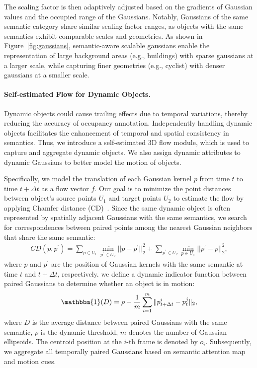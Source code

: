 The scaling factor is then adaptively adjusted based on the gradients of Gaussian values and the occupied range of the Gaussians. Notably, Gaussians of the same semantic category share similar scaling factor ranges, as objects with the same semantics exhibit comparable scales and geometries. As shown in Figure~\ref{fig:gaussians}, semantic-aware scalable gaussians enable the representation of large background areas (e.g., buildings) with sparse gaussians at a larger scale, while capturing finer geometries (e.g., cyclist) with denser gaussians at a smaller scale.






\vspace{-4mm}
\paragraph{Self-estimated Flow for Dynamic Objects.}
Dynamic objects could cause trailing effects due to temporal variations, thereby reducing the accuracy of occupancy annotation. Independently handling dynamic objects facilitates the enhancement of temporal and spatial consistency in semantics. Thus, we introduce a self-estimated 3D flow module, which is used to capture and aggregate dynamic objects. We also assign dynamic attributes to dynamic Gaussians to better model the motion of objects.

Specifically, we model the translation of each Gaussian kernel $p$ from time $t$ to time $t+ \Delta t$ as a flow vector $f$. Our goal is to minimize the point distances between object's source points $U_1$ and target points $U_2$ to estimate the flow by applying Chamfer distance (CD)~\cite{fan2017point}. Since the same dynamic object is often represented by spatially adjacent Gaussians with the same semantics, we search for correspondences between paired points among the nearest Gaussian neighbors that share the same semantic:
\begin{equation}
\begin{aligned}
    CD(p,p^{\prime}) = \sum_{p \in U_1}\mathop{\min}_{p^{\prime} \in U_2}||p-p^{\prime} ||_2^2 + \sum_{p^{\prime} \in U_2}\mathop{\min}_{p \in U_1}||p^{\prime} -p||_2^2 ,
\end{aligned}
\end{equation}
where $p$ and $p^{\prime}$ are the position of Gaussian kernels with the same semantic at time $t$ and $t+ \Delta t$, respectively.
%
we define a dynamic indicator function between paired Gaussians to determine whether an object is in motion:
\begin{equation}
\begin{aligned}
    \mathbbm{1}(D) = \rho - \frac{1}{m} \sum_{i=1}^{m} \|p_{t+\Delta t}^{i} - p_t^{j}\|_{2} ,
\end{aligned}
\end{equation}
where $D$ is the average distance between paired Gaussians with the same semantic, $\rho$ is the dynamic threshold, $m$ denotes the number of Gaussian ellipsoids. The centroid position at the $i$-th frame is denoted by $o_i$. Subsequently, we aggregate all temporally paired Gaussians based on semantic attention map and motion cues.






